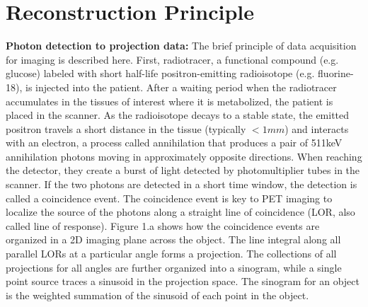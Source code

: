 \documentclass[11pt,a4paper]{article}
\begin{document}
    \section{Reconstruction Principle}
    \label{sec:principle}
    \textbf{Photon detection to projection data:} The brief principle of data acquisition for imaging is described here. First, radiotracer, a functional compound (e.g. glucose) labeled with short half-life positron-emitting radioisotope (e.g. fluorine-18), is injected into the patient. After a waiting period when the radiotracer accumulates in the tissues of interest where it is metabolized, the patient is placed in the scanner. As the radioisotope decays to a stable state, the emitted positron travels a short distance in the tissue (typically $<1mm$) and interacts with an electron, a process called annihilation that produces a pair of 511keV annihilation photons moving in approximately opposite directions. When reaching the detector, they create a burst of light detected by photomultiplier tubes in the scanner. If the two photons are detected in a short time window, the detection is called a coincidence event. The coincidence event is key to PET imaging to localize the source of the photons along a straight line of coincidence (LOR, also called line of response). Figure 1.a shows how the coincidence events are organized in a 2D imaging plane across the object. The line integral along all parallel LORs at a particular angle forms a projection. The collections of all projections for all angles are further organized into a sinogram, while a single point source traces a sinusoid in the projection space. The sinogram for an object is the weighted summation of the sinusoid of each point in the object\cite{tong2010petctreview}. 
\end{document}

